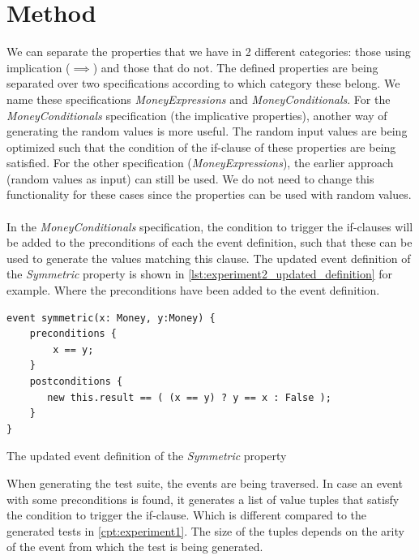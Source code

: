 \section{Method}
\label{sct:experiment2_method}
We can separate the properties that we have in 2 different categories: those
using implication ($\implies$) and those that do not. The defined properties are
being separated over two specifications according to which category these
belong. We name these specifications \textit{MoneyExpressions} and
\textit{MoneyConditionals}. For the \textit{MoneyConditionals} specification
(the implicative properties), another way of generating the random values is
more useful. The random input values are being optimized such that the condition
of the if-clause of these properties are being satisfied. For the other
specification (\textit{MoneyExpressions}), the earlier approach (random values
as input) can still be used. We do not need to change this functionality for
these cases since the properties can be used with random values.\\
\\
In the \textit{MoneyConditionals} specification, the condition to trigger the
if-clauses will be added to the preconditions of each the event definition, such
that these can be used to generate the values matching this clause. The updated
event definition of the \textit{Symmetric} property is shown in
\autoref{lst:experiment2_updated_definition} for example. Where the
preconditions have been added to the event definition.
\begin{sourcecode}[!ht]
\begin{lstlisting}[language=Rebel]
event symmetric(x: Money, y:Money) {
    preconditions {
        x == y;
    }
    postconditions {
       new this.result == ( (x == y) ? y == x : False );
    }
}
\end{lstlisting}
\caption{The updated event definition of the \textit{Symmetric} property}
\label{lst:experiment2_updated_definition}
\end{sourcecode}
\FloatBarrier\noindent
When generating the test suite, the events are being traversed. In case an
event with some preconditions is found, it generates a list of value tuples that
satisfy the condition to trigger the if-clause. Which is different compared to
the generated tests in \autoref{cpt:experiment1}. The size of the tuples depends
on the arity of the event from which the test is being generated.\\
